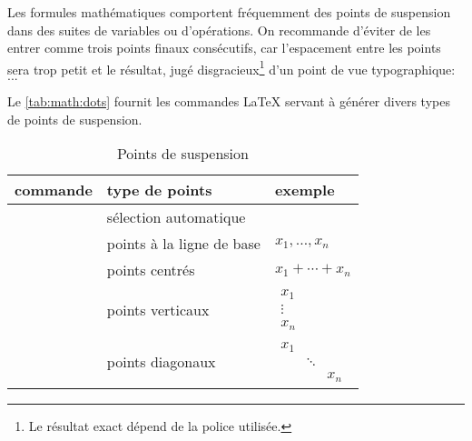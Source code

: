 Les formules mathématiques comportent fréquemment des points de
suspension dans des suites de variables ou d'opérations. On recommande
d'éviter de les entrer comme trois points finaux consécutifs, car
l'espacement entre les points sera trop petit et le résultat, jugé
disgracieux\footnote{%
  Le résultat exact dépend de la police utilisée.} %
d'un point de vue typographique: $...$

Le \autoref{tab:math:dots} fournit les commandes {\LaTeX} servant à
générer divers types de points de suspension.

\begin{table}
  \caption{Points de suspension}
  \label{tab:math:dots}
  \centering
  \begin{tabular}{lll}
    \toprule
    commande & type de points & exemple \\
    \midrule
    \cmd{\dots} &  sélection automatique \\
    \cmd{\ldots} & points à la ligne de base & $x_1, \ldots, x_n$ \\
    \cmd{\cdots} & points centrés & $x_1 + \cdots + x_n$ \\
    \addlinespace[0.5\normalbaselineskip]
    \cmd{\vdots} & points verticaux & $
                                      \begin{matrix}
                                        x_1 \\ \vdots \\ x_n
                                      \end{matrix}$ \\
    \addlinespace[0.5\normalbaselineskip]
    \cmd{\ddots} & points diagonaux & $
                                      \begin{matrix}
                                        x_1 &&\\ &\ddots& \\ && x_n
                                      \end{matrix}$ \\
    \bottomrule
  \end{tabular}
\end{table}

